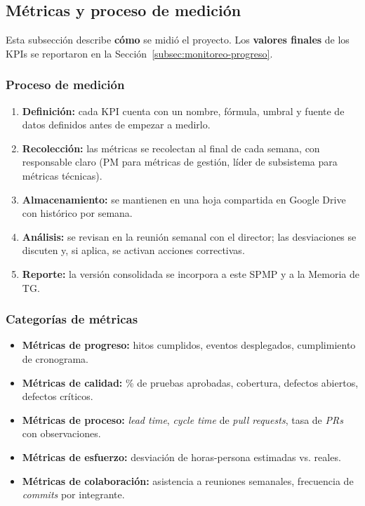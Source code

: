 \documentclass[12pt,oneside]{report}
\begin{document}
    \subsection{Métricas y proceso de medición}
    \label{subsec:metricas-medicion}

      Esta subsección describe \textbf{cómo} se midió el proyecto. Los \textbf{valores finales} de los KPIs se reportaron en la Sección~\ref{subsec:monitoreo-progreso}.

      \subsubsection{Proceso de medición}
      \begin{enumerate}
        \item \textbf{Definición:} cada KPI cuenta con un nombre, fórmula, umbral y fuente de datos definidos antes de empezar a medirlo.
        \item \textbf{Recolección:} las métricas se recolectan al final de cada semana, con responsable claro (PM para métricas de gestión, líder de subsistema para métricas técnicas).
        \item \textbf{Almacenamiento:} se mantienen en una hoja compartida en Google Drive con histórico por semana.
        \item \textbf{Análisis:} se revisan en la reunión semanal con el director; las desviaciones se discuten y, si aplica, se activan acciones correctivas.
        \item \textbf{Reporte:} la versión consolidada se incorpora a este SPMP y a la Memoria de TG.
      \end{enumerate}

      \subsubsection{Categorías de métricas}
      \begin{itemize}
        \item \textbf{Métricas de progreso:} hitos cumplidos, eventos desplegados, cumplimiento de cronograma.
        \item \textbf{Métricas de calidad:} \% de pruebas aprobadas, cobertura, defectos abiertos, defectos críticos.
        \item \textbf{Métricas de proceso:} \textit{lead time}, \textit{cycle time} de \textit{pull requests}, tasa de \textit{PRs} con observaciones.
        \item \textbf{Métricas de esfuerzo:} desviación de horas-persona estimadas vs. reales.
        \item \textbf{Métricas de colaboración:} asistencia a reuniones semanales, frecuencia de \textit{commits} por integrante.
      \end{itemize}
\end{document}
